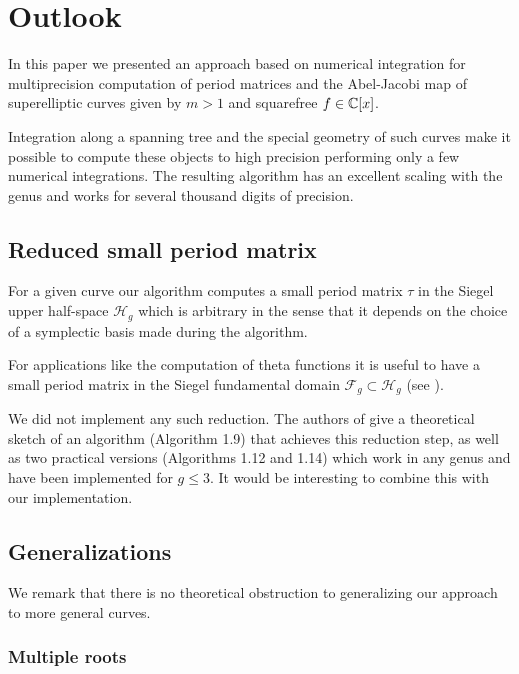 \documentclass[main.tex]{subfiles}
\begin{document}
  \section{Outlook}\label{sec:outlook}

  In this paper we presented an approach based on numerical integration for
  multiprecision computation of period matrices and the Abel-Jacobi map of
  superelliptic curves given by $m > 1$ and squarefree $f \in \mathbb{C}[x]$.
 
  Integration along a spanning tree and the special geometry of such curves
  make it possible to compute these objects to high precision performing only
  a few numerical integrations. The resulting algorithm has an excellent
  scaling with the genus and works for several thousand digits of precision.

  \subsection{Reduced small period matrix}

   For a given curve our algorithm computes a small period matrix
   $\tau$ in the Siegel upper half-space $\mathcal{H}_g$ which is arbitrary
   in the sense that it depends on the choice of a symplectic basis made
   during the algorithm.
   
   For applications like the computation of theta functions it is useful to
   have a small period matrix in the Siegel fundamental domain $\mathcal{F}_g \subset
   \mathcal{H}_g$ (see \cite[\S 1.3]{PlaneQuarticsCM}).
  
   We did not implement any such reduction.
   The authors of \cite{PlaneQuarticsCM} give a theoretical sketch of
   an algorithm (Algorithm 1.9) that achieves this reduction step, as well as
   two practical versions (Algorithms 1.12 and 1.14) which work in any genus and have been implemented for $g
   \le 3$. It would be interesting to combine this with our implementation.
  
  \subsection{Generalizations}
  
  We remark that there is no theoretical obstruction to generalizing our
  approach to more general curves.
  
  \subsubsection{Multiple roots}
  \label{subsec:nonseparable}
  
\end{document}
